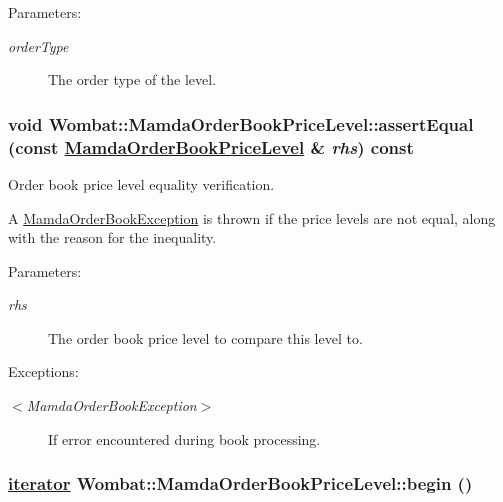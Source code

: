 \begin{Desc}
\item[Parameters:]
\begin{description}
\item[{\em order\-Type}]The order type of the level. \end{description}
\end{Desc}
\hypertarget{classWombat_1_1MamdaOrderBookPriceLevel_7a19253c0da8d8bd8139aeebc5c4a505}{
\subsubsection[assertEqual]{\setlength{\rightskip}{0pt plus 5cm}void Wombat::Mamda\-Order\-Book\-Price\-Level::assert\-Equal (const \hyperlink{classWombat_1_1MamdaOrderBookPriceLevel}{Mamda\-Order\-Book\-Price\-Level} \& {\em rhs}) const}}
\label{classWombat_1_1MamdaOrderBookPriceLevel_7a19253c0da8d8bd8139aeebc5c4a505}


Order book price level equality verification. 

A \hyperlink{classWombat_1_1MamdaOrderBookException}{Mamda\-Order\-Book\-Exception} is thrown if the price levels are not equal, along with the reason for the inequality.

\begin{Desc}
\item[Parameters:]
\begin{description}
\item[{\em rhs}]The order book price level to compare this level to.\end{description}
\end{Desc}
\begin{Desc}
\item[Exceptions:]
\begin{description}
\item[{\em $<$Mamda\-Order\-Book\-Exception$>$}]If error encountered during book processing. \end{description}
\end{Desc}
\hypertarget{classWombat_1_1MamdaOrderBookPriceLevel_bb494982acb64bc69a989077fb00a190}{
\subsubsection[begin]{\setlength{\rightskip}{0pt plus 5cm}\hyperlink{classWombat_1_1MamdaOrderBookPriceLevel_1_1iterator}{iterator} Wombat::Mamda\-Order\-Book\-Price\-Level::begin ()}}
\label{classWombat_1_1MamdaOrderBookPriceLevel_bb494982acb64bc69a989077fb00a190}



